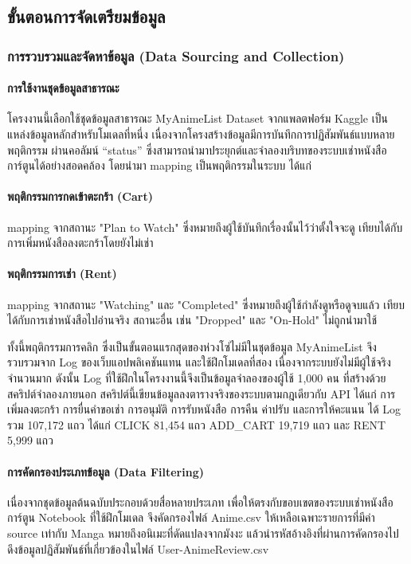 \subsection{ขั้นตอนการจัดเตรียมข้อมูล}

\subsubsection{การรวบรวมและจัดหาข้อมูล (Data Sourcing and Collection)}

\paragraph{การใช้งานชุดข้อมูลสาธารณะ}
โครงงานนี้เลือกใช้ชุดข้อมูลสาธารณะ MyAnimeList Dataset จากแพลตฟอร์ม Kaggle เป็นแหล่งข้อมูลหลักสำหรับโมเดลที่หนึ่ง เนื่องจากโครงสร้างข้อมูลมีการบันทึกการปฏิสัมพันธ์แบบหลายพฤติกรรม ผ่านคอลัมน์ “status” ซึ่งสามารถนำมาประยุกต์และจำลองบริบทของระบบเช่าหนังสือการ์ตูนได้อย่างสอดคล้อง โดยนำมา mapping เป็นพฤติกรรมในระบบ ได้แก่

\paragraph{พฤติกรรมการกดเข้าตะกร้า (Cart)}
mapping จากสถานะ "Plan to Watch" ซึ่งหมายถึงผู้ใช้บันทึกเรื่องนั้นไว้ว่าตั้งใจจะดู เทียบได้กับการเพิ่มหนังสือลงตะกร้าโดยยังไม่เช่า

\paragraph{พฤติกรรมการเช่า (Rent)}
mapping จากสถานะ "Watching" และ "Completed" ซึ่งหมายถึงผู้ใช้กำลังดูหรือดูจบแล้ว เทียบได้กับการเช่าหนังสือไปอ่านจริง สถานะอื่น เช่น "Dropped" และ "On-Hold" ไม่ถูกนำมาใช้

ทั้งนี้พฤติกรรมการคลิก ซึ่งเป็นขั้นตอนแรกสุดของห่วงโซ่ไม่มีในชุดข้อมูล MyAnimeList จึงรวบรวมจาก Log ของเว็บแอปพลิเคชันแทน และใช้ฝึกโมเดลที่สอง เนื่องจากระบบยังไม่มีผู้ใช้จริงจำนวนมาก ดังนั้น Log ที่ใช้ฝึกในโครงงานนี้จึงเป็นข้อมูลจำลองของผู้ใช้ 1,000 คน ที่สร้างด้วยสคริปต์จำลองภายนอก สคริปต์นี้เขียนข้อมูลลงตารางจริงของระบบตามกฎเดียวกับ API ได้แก่ การเพิ่มลงตะกร้า การยื่นคำขอเช่า การอนุมัติ การรับหนังสือ การคืน ค่าปรับ และการให้คะแนน ได้ Log รวม 107,172 แถว ได้แก่ CLICK 81,454 แถว ADD\_CART 19,719 แถว และ RENT 5,999 แถว

\paragraph{การคัดกรองประเภทข้อมูล (Data Filtering)}
เนื่องจากชุดข้อมูลต้นฉบับประกอบด้วยสื่อหลายประเภท เพื่อให้ตรงกับขอบเขตของระบบเช่าหนังสือการ์ตูน Notebook ที่ใช้ฝึกโมเดล จึงคัดกรองไฟล์ Anime.csv ให้เหลือเฉพาะรายการที่มีค่า source เท่ากับ Manga หมายถึงอนิเมะที่ดัดแปลงจากมังงะ แล้วนำรหัสอ้างอิงที่ผ่านการคัดกรองไปดึงข้อมูลปฏิสัมพันธ์ที่เกี่ยวข้องในไฟล์ User-AnimeReview.csv 

